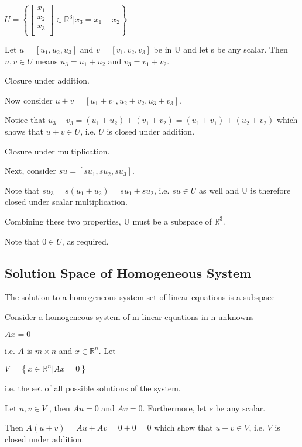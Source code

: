 \documentclass{extarticle}
\begin{document}
\begin{multicols}{2}
$U=\left\{
{\left[\begin{matrix}x_1\\x_2\\x_3\\\end{matrix}\right]}
\in \mathbb{R}^3
\vert
x_3=x_1 + x_2
 \right\}$

Let $u = [u_1, u_2, u_3]$ and $v = [v_1, v_2, v_3]$ be in U and let s be any scalar. Then $u, v \in U$ means $u_3 = u_1 + u_2$ and $v_3 = v_1 + v_2$.

Closure under addition. 

Now consider $u+v = [u_1+v_1, u_2+v_2, u_3+v_3]$.

Notice that $u_3+v_3 = (u_1+u_2)+(v_1+v_2) = (u_1 + v_1) + (u_2 + v_2)$ which shows that $u + v \in U$, i.e. $U$ is closed under addition.

Closure under multiplication.

Next, consider $su = [su_1, su_2, su_3]$.

Note that $su_3 = s(u_1 + u_2) = su_1 + su_2$, i.e. $su \in U$ as well and U is therefore closed under scalar multiplication.

Combining these two properties, U must be a subspace of ${\mathbb{R}}^3$.



Note that $0 \in U$, as required.





\subsection{Solution Space of Homogeneous System}
The solution to a homogeneous system set of linear equations is a subspace
\begin{tcolorbox}[enhanced jigsaw,sharp corners,coltext=black,colback=BurntOrange!25!white,boxrule=0pt,breakable,size=minimal]
Consider a homogeneous system of m linear equations in n unknowns

$Ax=0$

i.e. $A$ is $m \times n$ and $x \in{\mathbb{R}}^n$. Let

$V=\left\{
x
\in \mathbb{R}^n
\vert
Ax=0
 \right\}$


i.e. the set of all possible solutions of the system.

Let $u, v \in V$ , then $Au = 0$ and $Av = 0$. Furthermore, let $s$ be any scalar.

Then $A(u + v) = Au + Av = 0 + 0 = 0$ which show that $u + v \in V$, i.e. $V$ is closed under addition.


\end{tcolorbox}
\end{multicols}
\end{document}
